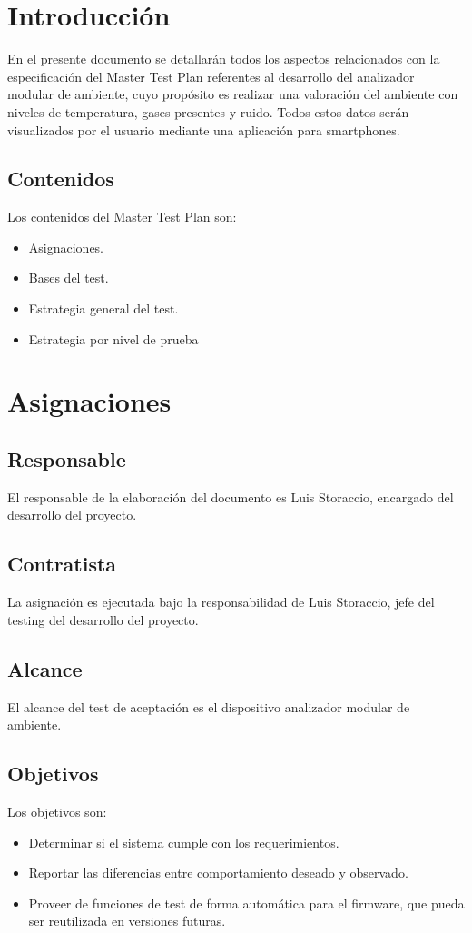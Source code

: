 \documentclass[11pt]{article}
\begin{document}
\section{Introducción}
En el presente documento se detallarán todos los aspectos relacionados con la
especificación del Master Test Plan referentes al desarrollo del analizador
modular de ambiente, cuyo propósito es realizar una valoración del ambiente con
niveles de temperatura, gases presentes y ruido. Todos estos datos serán
visualizados por el usuario mediante una aplicación para smartphones.
\subsection{Contenidos}
Los contenidos del Master Test Plan son:
\begin{itemize}
    \item Asignaciones.
    \item Bases del test.
    \item Estrategia general del test.
    \item Estrategia por nivel de prueba
\end{itemize}

\section{Asignaciones}

\subsection{Responsable}
El responsable de la elaboración del documento es Luis Storaccio, encargado del
desarrollo del proyecto.
\subsection{Contratista}
La asignación es ejecutada bajo la responsabilidad de Luis Storaccio, jefe del
testing del desarrollo del proyecto.
\subsection{Alcance}
El alcance del test de aceptación es el dispositivo analizador modular de
ambiente.
\subsection{Objetivos}
Los objetivos son:
\begin{itemize}
    \item Determinar si el sistema cumple con los requerimientos.
    \item Reportar las diferencias entre comportamiento deseado y observado.
    \item Proveer de funciones de test de forma automática para el firmware,
          que
          pueda ser reutilizada en versiones futuras.
\end{itemize}
\end{document}
